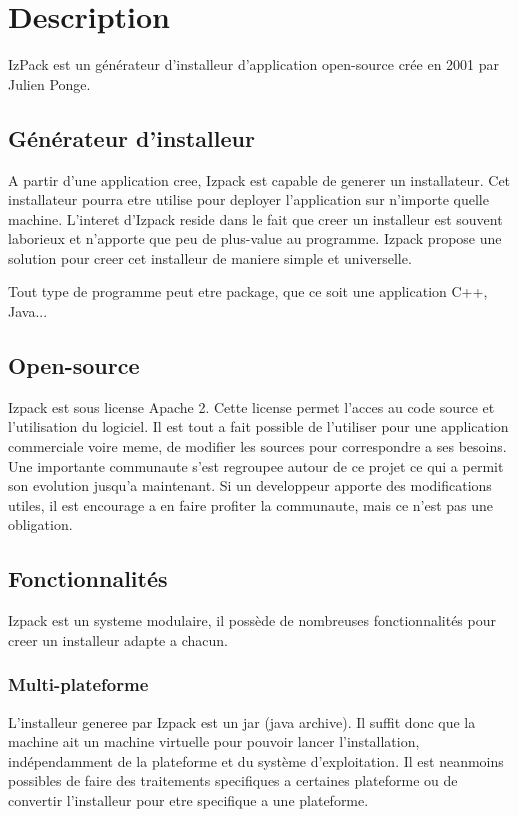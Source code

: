 \section{Description}
IzPack est un générateur d'installeur d'application open-source crée en 2001 par Julien Ponge.
\subsection{Générateur d'installeur}
A partir d'une application cree, Izpack est capable de generer un installateur. Cet installateur pourra etre utilise pour deployer l'application sur n'importe quelle machine. L'interet d'Izpack reside dans le fait que creer un installeur est souvent laborieux et n'apporte que peu de plus-value au programme. Izpack propose une solution pour creer cet installeur de maniere simple et universelle. 

Tout type de programme peut etre package, que ce soit une application C++, Java...
\subsection{Open-source}
Izpack est sous license Apache 2. Cette license permet l'acces au code source et l'utilisation du logiciel. Il est tout a fait possible de l'utiliser pour une application commerciale voire meme, de modifier les sources pour correspondre a ses besoins. Une importante communaute s'est regroupee autour de ce projet ce qui a permit son evolution jusqu'a maintenant. Si un developpeur apporte des modifications utiles, il est encourage a en faire profiter la communaute, mais ce n'est pas une obligation.

\subsection{Fonctionnalités}
Izpack est un systeme modulaire, il possède de nombreuses fonctionnalités pour creer un installeur adapte a chacun.
\subsubsection{Multi-plateforme}
L'installeur generee par Izpack est un jar (java archive). Il suffit donc que la machine ait un machine virtuelle pour pouvoir lancer l'installation, indépendamment de la plateforme et du système d'exploitation. Il est neanmoins possibles de faire des traitements specifiques a certaines plateforme ou de convertir l'installeur pour etre specifique a une plateforme. 
